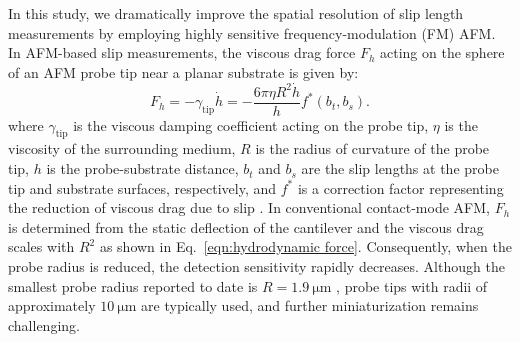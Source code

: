 \documentclass[journal=jacsat,manuscript=article]{achemso}
\begin{document}
In this study, we dramatically improve the spatial resolution of slip length measurements by employing highly sensitive frequency-modulation (FM) AFM. In AFM-based slip measurements, the viscous drag force \(F_h\) acting on the sphere of an AFM probe tip near a planar substrate is given by:
\begin{equation}
F_h=-\gamma_{\text{tip}} \dot{h}=-\frac{6\pi\eta R^2 \dot{h}}{h} f^* (b_t,b_s). \label{eqn:hydrodynamic force}
\end{equation}
where \(\gamma_{\text{tip}}\) is the viscous damping coefficient acting on the probe tip,  \(\eta\) is the viscosity of the surrounding medium, \(R\) is the radius of curvature of the probe tip, \(h\) is the probe-substrate distance, \(b_t\) and \(b_s\) are the slip lengths at the probe tip and substrate surfaces, respectively, and \(f^*\) is a correction factor representing the reduction of viscous drag due to slip \cite{Vinogradova1995-ct}. In conventional contact-mode AFM, \(F_h\) is determined from the static deflection of the cantilever and the viscous drag scales with \(R^2\) as shown in Eq.~\ref{eqn:hydrodynamic force}.  Consequently, when the probe radius is reduced, the detection sensitivity rapidly decreases. Although the smallest probe radius reported to date is \(R = \SI{1.9}{\micro\metre}\) \cite{Vinogradova2003-gh}, probe tips with radii of approximately \(\SI{10}{\micro\metre}\) \cite{Li2022-qs} are typically used, and further miniaturization remains challenging.
\end{document}
